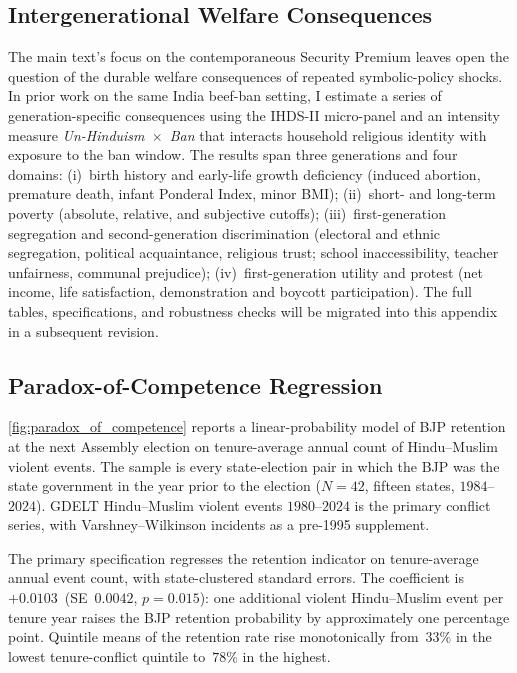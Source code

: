 \documentclass[11pt,twoside]{extarticle}
\begin{document}
\subsection{Intergenerational Welfare Consequences} \label{app:intergenerational}

The main text's focus on the contemporaneous Security Premium leaves open the
question of the durable welfare consequences of repeated symbolic-policy
shocks. In prior work on the same India beef-ban setting, I estimate a series
of generation-specific consequences using the IHDS-II micro-panel and an
intensity measure \textit{Un-Hinduism~$\times$~Ban} that interacts household
religious identity with exposure to the ban window. The results span three
generations and four domains: (i)~birth history and early-life growth
deficiency (induced abortion, premature death, infant Ponderal Index, minor
BMI); (ii)~short- and long-term poverty (absolute, relative, and subjective
cutoffs); (iii)~first-generation segregation and second-generation
discrimination (electoral and ethnic segregation, political acquaintance,
religious trust; school inaccessibility, teacher unfairness, communal
prejudice); (iv)~first-generation utility and protest (net income, life
satisfaction, demonstration and boycott participation). The full tables,
specifications, and robustness checks will be migrated into this appendix in a subsequent revision.

\subsection{Paradox-of-Competence Regression}\label{app:paradox_regression}

\autoref{fig:paradox_of_competence} reports a linear-probability model of
BJP retention at the next Assembly election on tenure-average annual count
of Hindu--Muslim violent events. The sample is every state-election pair in
which the BJP was the state government in the year prior to the election
($N=42$, fifteen states, $1984$--$2024$). GDELT Hindu--Muslim violent
events $1980$--$2024$ is the primary conflict series, with
Varshney--Wilkinson incidents as a pre-1995 supplement.

The primary specification regresses the retention indicator on
tenure-average annual event count, with state-clustered standard
errors. The coefficient is~$+0.0103$~(SE~$0.0042$, $p=0.015$): one
additional violent Hindu--Muslim event per tenure year raises the BJP
retention probability by approximately one percentage point. Quintile
means of the retention rate rise monotonically from~$33\%$ in the lowest
tenure-conflict quintile to~$78\%$ in the highest.
\end{document}
